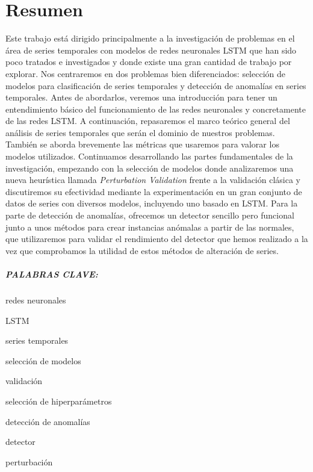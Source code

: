 %


\chapter*{Resumen}\label{ch:resumen}

Este trabajo está dirigido principalmente a la investigación de problemas en el área de series temporales con modelos de redes neuronales LSTM que han sido poco tratados e investigados y donde existe una gran cantidad de trabajo por explorar. Nos centraremos en dos problemas bien diferenciados: selección de modelos para clasificación de series temporales y detección de anomalías en series temporales. Antes de abordarlos, veremos una introducción para tener un entendimiento básico del funcionamiento de las redes neuronales y concretamente de las redes LSTM. A continuación, repasaremos el marco teórico general del análisis de series temporales que serán el dominio de nuestros problemas. También se aborda brevemente las métricas que usaremos para valorar los modelos utilizados. Continuamos desarrollando las partes fundamentales de la investigación, empezando con la selección de modelos donde analizaremos una nueva heurística llamada \emph{Perturbation Validation} frente a la validación clásica y discutiremos su efectividad mediante la experimentación en un gran conjunto de datos de series con diversos modelos, incluyendo uno basado en LSTM. Para la parte de detección de anomalías, ofrecemos un detector sencillo pero funcional junto a unos métodos para crear instancias anómalas a partir de las normales, que utilizaremos para validar el rendimiento del detector que hemos realizado a la vez que comprobamos la utilidad de estos métodos de alteración de series.

\paragraph{PALABRAS CLAVE:}
\begin{itemize*}[label=,itemsep=1em,itemjoin=\hspace{1em}]
  \item redes neuronales
  \item LSTM
  \item series temporales
  \item selección de modelos
  \item validación
  \item selección de hiperparámetros
  \item detección de anomalías
  \item detector
  \item perturbación
\end{itemize*}

\endinput
